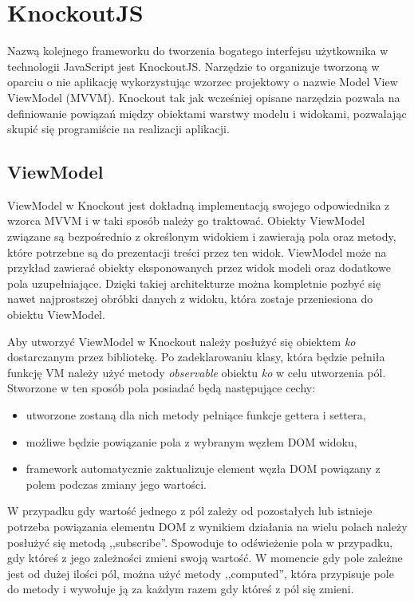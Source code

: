 \section{KnockoutJS}
Nazwą kolejnego frameworku do tworzenia bogatego interfejsu użytkownika w technologii JavaScript jest KnockoutJS. Narzędzie to organizuje tworzoną w oparciu o nie aplikację wykorzystując wzorzec projektowy o nazwie Model View ViewModel (MVVM)\cite{knockout-doc}. Knockout tak jak wcześniej opisane narzędzia pozwala na definiowanie powiązań między obiektami warstwy modelu i widokami, pozwalając skupić się programiście na realizacji aplikacji.


\subsection{ViewModel}
ViewModel w Knockout jest dokładną implementacją swojego odpowiednika z wzorca MVVM i w taki sposób należy go traktować. Obiekty ViewModel związane są bezpośrednio z określonym widokiem i zawierają pola oraz metody, które potrzebne są do prezentacji treści przez ten widok. ViewModel może na przykład zawierać obiekty eksponowanych przez widok modeli oraz dodatkowe pola uzupełniające. Dzięki takiej architekturze można kompletnie pozbyć się nawet najprostszej obróbki danych z widoku, która zostaje przeniesiona do obiektu ViewModel.

Aby utworzyć ViewModel w Knockout należy posłużyć się obiektem \textit{ko} dostarczanym przez bibliotekę. Po zadeklarowaniu klasy, która będzie pełniła funkcję VM należy użyć metody \textit{observable} obiektu \textit{ko} w celu utworzenia pól. Stworzone w ten sposób pola posiadać będą następujące cechy:
\begin{itemize}
\item utworzone zostaną dla nich metody pełniące funkcje gettera i settera,
\item możliwe będzie powiązanie pola z wybranym węzłem DOM widoku,
\item framework automatycznie zaktualizuje element węzła DOM powiązany z polem podczas zmiany jego wartości.
\end{itemize}

W przypadku gdy wartość jednego z pól zależy od pozostałych lub istnieje potrzeba powiązania elementu DOM z wynikiem działania na wielu polach należy posłużyć się metodą ,,subscribe''.
Spowoduje to odświeżenie pola w przypadku, gdy któreś z jego zależności zmieni swoją wartość. W momencie gdy pole zależne jest od dużej ilości pól, można użyć metody ,,computed'', która przypisuje pole do metody i wywołuje ją za każdym razem gdy któreś z pól się zmieni.

